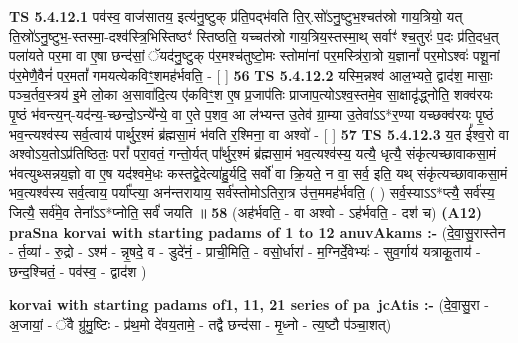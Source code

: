 \documentclass[17pt]{extarticle}
\begin{document}
                                        \textbf{ TS 5.4.12.1} \newline
                  पव॑स्व॒ वाज॑सातय॒ इत्य॑नु॒ष्टुक् प्र॑ति॒पद्भ॑वति ति॒र्.सो॑ऽनु॒ष्टुभ॒श्चत॑स्रो गाय॒त्रियो॒ यत् ति॒स्रो॑ऽनु॒ष्टुभ॒-स्तस्मा॒-दश्व॑स्त्रि॒भिस्तिष्ठꣳ॑ स्तिष्ठति॒ यच्चत॑स्रो गाय॒त्रिय॒स्तस्मा॒थ् सर्वाꣳ॑ श्च॒तुरः॑ प॒दः प्र॑ति॒दध॒त् पला॑यते पर॒मा वा ए॒षा छन्द॑सां॒ ॅयद॑नु॒ष्टुक् प॑र॒मश्च॑तुष्टो॒मः स्तोमा॑नां पर॒मस्त्रि॑रा॒त्रो य॒ज्ञानां᳚ पर॒मोऽश्वः॑ पशू॒नां प॑र॒मेणै॒वैनं॑ पर॒मतां᳚ गमयत्येकविꣳ॒॒शमह॑र्भवति॒ - [  ] \textbf{  56} \newline
                  \newline
                                \textbf{ TS 5.4.12.2} \newline
                  यस्मि॒न्नश्व॑ आल॒भ्यते॒ द्वाद॑श॒ मासाः॒ पञ्च॒र्तव॒स्त्रय॑ इ॒मे लो॒का अ॒सावा॑दि॒त्य ए॑कविꣳ॒॒श ए॒ष प्र॒जाप॑तिः प्राजाप॒त्योऽश्व॒स्तमे॒व सा॒क्षादृ॑द्ध्नोति॒ शक्व॑रयः पृ॒ष्ठं भ॑वन्त्य॒न्-यद॑न्य॒-च्छन्दो॒ऽन्ये᳚न्ये॒ वा ए॒ते प॒शव॒ आ ल॑भ्यन्त उ॒तेव॑ ग्रा॒म्या उ॒तेवा॑ऽऽ*र॒ण्या यच्छक्व॑रयः पृ॒ष्ठं भव॒न्त्यश्व॑स्य सर्व॒त्वाय॑ पार्थुर॒श्मं ब्र॑ह्मसा॒मं भ॑वति र॒श्मिना॒ वा अश्वो॑ - [  ] \textbf{  57} \newline
                  \newline
                                \textbf{ TS 5.4.12.3} \newline
                  य॒त ई᳚श्व॒रो वा अश्वोऽय॒तोऽप्र॑तिष्ठितः॒ परां᳚ परा॒वतं॒ गन्तो॒र्यत् पा᳚र्थुर॒श्मं ब्र॑ह्मसा॒मं भव॒त्यश्व॑स्य॒ यत्यै॒ धृत्यै॒ संकृ॑त्यच्छावाकसा॒मं भ॑वत्युथ्सन्नय॒ज्ञो वा ए॒ष यद॑श्वमे॒धः कस्तद्वे॒देत्या॑हु॒र्यदि॒ सर्वो॑ वा क्रि॒यते॒ न वा॒ सर्व॒ इति॒ यथ् संकृ॑त्यच्छावाकसा॒मं भव॒त्यश्व॑स्य सर्व॒त्वाय॒ पर्या᳚प्त्या॒ अन॑न्तरायाय॒ सर्व॑स्तोमोऽतिरा॒त्र उ॑त्त॒ममह॑र्भवति॒ ( ) सर्व॒स्याऽऽ*प्त्यै॒ सर्व॑स्य॒ जित्यै॒ सर्व॑मे॒व तेना᳚ऽऽ*प्नोति॒ सर्वं॑ जयति ॥ \textbf{  58} \newline
                  \newline
                      (अह॑र्भवति॒ - वा अश्वो - ऽह॑र्भवति॒ - दश॑ च)  \textbf{(A12)} \newline \newline
                \textbf{praSna korvai with starting padams of 1 to 12 anuvAkams :-} \newline
        (दे॒वा॒सु॒रास्तेन - र्त॒व्या॑ - रु॒द्रो - ऽश्म॑ - न्नृ॒षदे॒ व - डुदे॑नं॒ - प्राची॒मिति॒ - वसो॒॒र्धारा॑ - म॒ग्निर्दे॒वेभ्यः॑ - सुव॒र्गाय॑ यत्राकू॒ताय॑ - छन्द॒श्चितं॒ - पव॑स्व॒ - द्वाद॑श ) \newline

        \textbf{korvai with starting padams of1, 11, 21 series of pa~jcAtis :-} \newline
        (दे॒वा॒सु॒रा - अ॒जायां॒ - ॅवै ग्रु॑मु॒ष्टिः - प्र॑थ॒मो दे॑वय॒तामे॒ - तद्वै छन्द॑सा - मृ॒ध्नो - त्य॒ष्टौ प॑ञ्चा॒शत्) \newline
\end{document}
